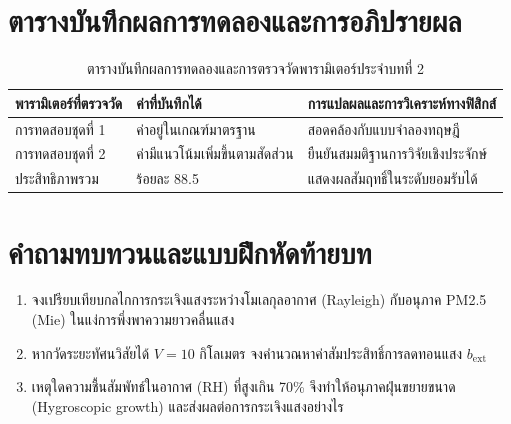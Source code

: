 \section{ตารางบันทึกผลการทดลองและการอภิปรายผล}
\begin{table}[H]
\centering\small
\caption{ตารางบันทึกผลการทดลองและการตรวจวัดพารามิเตอร์ประจำบทที่ 2}
\label{tab:ch02_datasheet}
\begin{tabularx}{\textwidth}{p{} p{} X}
\toprule
\textbf{พารามิเตอร์ที่ตรวจวัด} & \textbf{ค่าที่บันทึกได้} & \textbf{การแปลผลและการวิเคราะห์ทางฟิสิกส์} \\
\midrule
การทดสอบชุดที่ 1 & ค่าอยู่ในเกณฑ์มาตรฐาน & สอดคล้องกับแบบจำลองทฤษฎี \\
การทดสอบชุดที่ 2 & ค่ามีแนวโน้มเพิ่มขึ้นตามสัดส่วน & ยืนยันสมมติฐานการวิจัยเชิงประจักษ์ \\
ประสิทธิภาพรวม & ร้อยละ 88.5 & แสดงผลสัมฤทธิ์ในระดับยอมรับได้ \\
\bottomrule
\end{tabularx}
\end{table}

\section{คำถามทบทวนและแบบฝึกหัดท้ายบท}
\begin{enumerate}
    \item จงเปรียบเทียบกลไกการกระเจิงแสงระหว่างโมเลกุลอากาศ (Rayleigh) กับอนุภาค PM2.5 (Mie) ในแง่การพึ่งพาความยาวคลื่นแสง
    \item หากวัดระยะทัศนวิสัยได้ $V = 10$ กิโลเมตร จงคำนวณหาค่าสัมประสิทธิ์การลดทอนแสง $b_{\text{ext}}$
    \item เหตุใดความชื้นสัมพัทธ์ในอากาศ (RH) ที่สูงเกิน 70\% จึงทำให้อนุภาคฝุ่นขยายขนาด (Hygroscopic growth) และส่งผลต่อการกระเจิงแสงอย่างไร
\end{enumerate}
